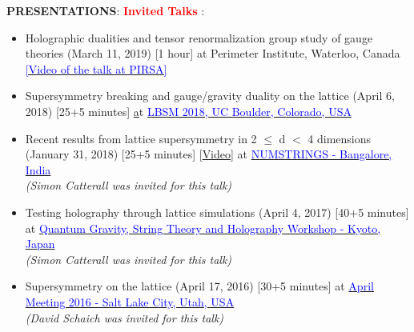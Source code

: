 {\bf PRESENTATIONS}:
\textcolor{red}{\textbf{Invited Talks}} :   
 \begin{itemize}
  \item Holographic dualities and tensor renormalization group study of gauge theories (March 11, 2019) [1 hour] at Perimeter Institute, Waterloo, Canada 
  \href{http://www.perimeterinstitute.ca/videos/interdisciplinary-seminar-holographic-dualities-and-tensor-renormalization-group-study-gauge}
{\textcolor{blue}{[Video of the talk at PIRSA]}} 
  \end{itemize}
  \begin{itemize}
  \item Supersymmetry breaking and gauge/gravity duality on the lattice (April 6, 2018) [25+5 minutes] \href{[http://www-hep.colorado.edu/~eneil/lbsm18/talks/Jha.pdf]} at 
  \href{http://www-hep.colorado.edu/~eneil/lbsm18/}{\textcolor{blue}{LBSM 2018, UC Boulder, Colorado, USA}} 
  \end{itemize} 
 
  \begin{itemize}
  \item Recent results from lattice supersymmetry in 2 $\le$ d $<$ 4 dimensions (January 31, 2018) [25+5 minutes] [\href{https://www.youtube.com/watch?v=Zey6DAEiw0c}{Video}] at 
  \href{https://www.icts.res.in/program/NUMSTRINGS2018}{\textcolor{blue}{NUMSTRINGS - Bangalore, India}} 
  \\
  \emph{(Simon Catterall was invited for this talk)} 
  \end{itemize} 
  
 
 \begin{itemize}
 \item Testing holography through lattice simulations (April 4, 2017) [40+5 minutes]  at 
 \href{https://sites.google.com/site/kyotoquantumgravity2017/home/program}{\textcolor{blue}{Quantum Gravity, String Theory and Holography Workshop - Kyoto, Japan}} \\
 \emph{(Simon Catterall was invited for this talk)} 
 \end{itemize}
 
 

\begin{itemize}
\item Supersymmetry on the lattice (April 17, 2016) [30+5 minutes]  at 
\href{https://absuploads.aps.org/presentation.cfm?pid=11807}{\textcolor{blue}{April Meeting 2016 - Salt Lake City, Utah, USA}}  \\
 \emph{(David Schaich was invited for this talk)}
\end{itemize}
  
